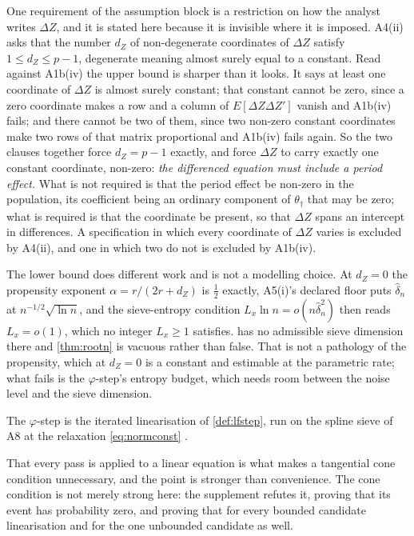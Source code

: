 \documentclass[
  12pt]{article}
\newcommand{\1}[1]{\mathds{1}\left[#1\right]}
\theoremstyle{plain}
\theoremstyle{definition}
\theoremstyle{definition}
\theoremstyle{remark}
\begin{document}
One requirement of the assumption block is a restriction on how the
analyst writes \(\Delta Z\), and it is stated here because it is
invisible where it is imposed. A4(ii) asks that the number \(d_Z\) of
non-degenerate coordinates of \(\Delta Z\) satisfy \(1\le d_Z\le p-1\),
degenerate meaning almost surely equal to a constant. Read against
A1b(iv) the upper bound is sharper than it looks. It says at least one
coordinate of \(\Delta Z\) is almost surely constant; that constant
cannot be zero, since a zero coordinate makes a row and a column of
\(E[\Delta Z\Delta Z']\) vanish and A1b(iv) fails; and there cannot be
two of them, since two non-zero constant coordinates make two rows of
that matrix proportional and A1b(iv) fails again. So the two clauses
together force \(d_Z=p-1\) exactly, and force \(\Delta Z\) to carry
exactly one constant coordinate, non-zero: \emph{the differenced
equation must include a period effect.} What is not required is that the
period effect be non-zero in the population, its coefficient being an
ordinary component of \(\theta_\dagger\) that may be zero; what is
required is that the coordinate be present, so that \(\Delta Z\) spans
an intercept in differences. A specification in which every coordinate
of \(\Delta Z\) varies is excluded by A4(ii), and one in which two do
not is excluded by A1b(iv).

The lower bound does different work and is not a modelling choice. At
\(d_Z=0\) the propensity exponent \(\alpha=r/(2r+d_Z)\) is \(\tfrac12\)
exactly, A5(i)'s declared floor puts \(\hat\delta_n\) at
\(n^{-1/2}\sqrt{\ln n}\), and the sieve-entropy condition
\(L_x\ln n=o(n\hat\delta_n^{2})\) then reads \(L_x=o(1)\), which no
integer \(L_x\ge1\) satisfies.  has no admissible
sieve dimension there and \cref{thm:rootn} is vacuous rather than false.
That is not a pathology of the propensity, which at \(d_Z=0\) is a
constant and estimable at the parametric rate; what fails is the
\(\varphi\)-step's entropy budget, which needs room between the noise
level and the sieve dimension.

The \(\varphi\)-step is the iterated linearisation of \cref{def:lfstep},
run on the spline sieve of A8
\citep[see][]{devorelorentz1993,schumaker2007} at the relaxation
\eqref{eq:normconst} \citep[see][]{dunker2014,engl2000}.

That every pass is applied to a linear equation is what makes a
tangential cone condition \citep{hanke1995} unnecessary, and the point
is stronger than convenience. The cone condition is not merely strong
here: the supplement refutes it, proving that its event has probability
zero, and proving that for every bounded candidate linearisation and for
the one unbounded candidate as well.
\end{document}
